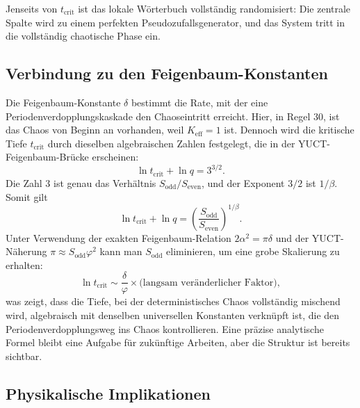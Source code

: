 \documentclass[12pt,a4paper]{article}
\begin{document}
	Jenseits von \(t_{\mathrm{crit}}\) ist das lokale Wörterbuch vollständig randomisiert: Die zentrale Spalte wird zu einem perfekten Pseudozufallsgenerator, und das System tritt in die vollständig chaotische Phase ein.
	
	\subsection{Verbindung zu den Feigenbaum-Konstanten}
	\label{subsec:feigenbaum-link}
	
	Die Feigenbaum-Konstante \(\delta\) bestimmt die Rate, mit der eine Periodenverdopplungskaskade den Chaoseintritt erreicht. Hier, in Regel 30, ist das Chaos von Beginn an vorhanden, weil \(K_{\mathrm{eff}}=1\) ist. Dennoch wird die kritische Tiefe \(t_{\mathrm{crit}}\) durch dieselben algebraischen Zahlen festgelegt, die in der YUCT-Feigenbaum-Brücke erscheinen:
	\[
	\ln t_{\mathrm{crit}} + \ln q = 3^{3/2}.
	\]
	Die Zahl \(3\) ist genau das Verhältnis \(S_{\mathrm{odd}}/S_{\mathrm{even}}\), und der Exponent \(3/2\) ist \(1/\beta\). Somit gilt
	\[
	\ln t_{\mathrm{crit}} + \ln q =
	\left(\frac{S_{\mathrm{odd}}}{S_{\mathrm{even}}}\right)^{\!1/\beta}.
	\]
	Unter Verwendung der exakten Feigenbaum-Relation \(2\alpha^{2} = \pi\delta\) und der YUCT-Näherung \(\pi \approx S_{\mathrm{odd}}\varphi^{2}\) kann man \(S_{\mathrm{odd}}\) eliminieren, um eine grobe Skalierung zu erhalten:
	\[
	\ln t_{\mathrm{crit}} \sim \frac{\delta}{\varphi} \times
	\bigl(\text{langsam veränderlicher Faktor}\bigr),
	\]
	was zeigt, dass die Tiefe, bei der deterministisches Chaos vollständig mischend wird, algebraisch mit denselben universellen Konstanten verknüpft ist, die den Periodenverdopplungsweg ins Chaos kontrollieren. Eine präzise analytische Formel bleibt eine Aufgabe für zukünftige Arbeiten, aber die Struktur ist bereits sichtbar.
	
	\subsection{Physikalische Implikationen}
	\label{subsec:implications}
	
\end{document}
